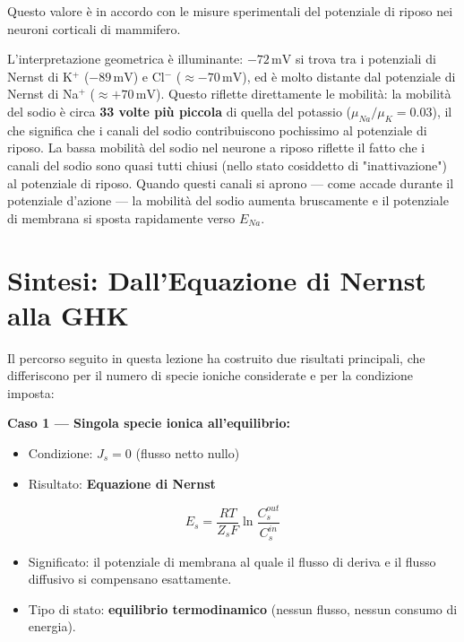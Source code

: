 Questo valore è in accordo con le misure sperimentali del potenziale di riposo nei neuroni corticali di mammifero.

L'interpretazione geometrica è illuminante: $-72\,\text{mV}$ si trova tra i potenziali di Nernst di K$^+$ ($-89\,\text{mV}$) e Cl$^-$ ($\approx -70\,\text{mV}$), ed è molto distante dal potenziale di Nernst di Na$^+$ ($\approx +70\,\text{mV}$). Questo riflette direttamente le mobilità: la mobilità del sodio è circa \textbf{33 volte più piccola} di quella del potassio ($\mu_{Na}/\mu_K = 0.03$), il che significa che i canali del sodio contribuiscono pochissimo al potenziale di riposo.
La bassa mobilità del sodio nel neurone a riposo riflette il fatto che i canali del sodio sono quasi tutti chiusi (nello stato cosiddetto di "inattivazione") al potenziale di riposo. Quando questi canali si aprono — come accade durante il potenziale d'azione — la mobilità del sodio aumenta bruscamente e il potenziale di membrana si sposta rapidamente verso $E_{Na}$.



\newpage 
\section{Sintesi: Dall'Equazione di Nernst alla GHK}


Il percorso seguito in questa lezione ha costruito due risultati principali, che differiscono per il numero di specie ioniche considerate e per la condizione imposta:

\textbf{Caso 1 — Singola specie ionica all'equilibrio:}
\begin{itemize}
    \item Condizione: $J_s = 0$ (flusso netto nullo)
    \item Risultato: \textbf{Equazione di Nernst}
\end{itemize}

\begin{equation}
E_s = \frac{RT}{Z_s F} \ln \frac{C_s^{out}}{C_s^{in}}
\end{equation}

\begin{itemize}
    \item Significato: il potenziale di membrana al quale il flusso di deriva e il flusso diffusivo si compensano esattamente.
    \item Tipo di stato: \textbf{equilibrio termodinamico} (nessun flusso, nessun consumo di energia).
\end{itemize}

